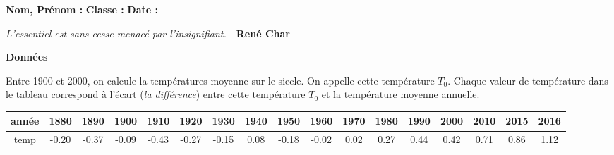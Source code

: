 \documentclass[10pt]{article}
\newcommand{\Pointille}[1][3]{\multido{}{#1}{ \makebox[\linewidth]{\dotfill}\\[\parskip]}}
\begin{document}

\textbf{Nom, Prénom :} \hspace{8cm} \textbf{Classe :} \hspace{3cm} \textbf{Date :}\\

\begin{center}
  \textit{L’essentiel est sans cesse menacé par l’insignifiant.}  - \textbf{René Char}
\end{center}

\vspace{-0.5cm}

\begin{figure}[H]
  \centering
\end{figure}

\Pointille[1]

\textbf{Données}

Entre 1900 et 2000, on calcule la températures moyenne sur le siecle. On appelle cette température $T_0$. Chaque valeur de température dans le tableau correspond à l'écart (\textit{la différence}) entre cette température $T_0$ et la température moyenne annuelle.
\begin{center}
  \begin{tabular}{| c| c   |     c |   c |    c |    c |    c |    c |    c |    c |    c |    c |    c |    c |    c |    c |   c |}
    \hline
    année & 1880 &  1890 &  1900 &  1910 &  1920 &  1930 & 1940 &  1950 &  1960 & 1970 & 1980 & 1990 & 2000 & 2010 & 2015 & 2016 \\
    \hline
    temp & -0.20 & -0.37 & -0.09 & -0.43 & -0.27 & -0.15 & 0.08 & -0.18 & -0.02 & 0.02 & 0.27 & 0.44 & 0.42 & 0.71 & 0.86 & 1.12 \\
    \hline
  \end{tabular}
\end{center}

\noindent\hrulefill
\end{document}
